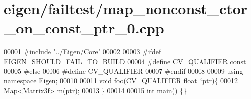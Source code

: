 \hypertarget{eigen_2failtest_2map__nonconst__ctor__on__const__ptr__0_8cpp_source}{}\section{eigen/failtest/map\+\_\+nonconst\+\_\+ctor\+\_\+on\+\_\+const\+\_\+ptr\+\_\+0.cpp}
\label{eigen_2failtest_2map__nonconst__ctor__on__const__ptr__0_8cpp_source}

\begin{DoxyCode}
00001 \textcolor{preprocessor}{#include "../Eigen/Core"}
00002 
00003 \textcolor{preprocessor}{#ifdef EIGEN\_SHOULD\_FAIL\_TO\_BUILD}
00004 \textcolor{preprocessor}{#define CV\_QUALIFIER const}
00005 \textcolor{preprocessor}{#else}
00006 \textcolor{preprocessor}{#define CV\_QUALIFIER}
00007 \textcolor{preprocessor}{#endif}
00008 
00009 \textcolor{keyword}{using namespace }\hyperlink{namespace_eigen}{Eigen};
00010 
00011 \textcolor{keywordtype}{void} foo(CV\_QUALIFIER \textcolor{keywordtype}{float} *ptr)\{
00012     \hyperlink{group___core___module_class_eigen_1_1_map}{Map<Matrix3f>} m(ptr);
00013 \}
00014 
00015 \textcolor{keywordtype}{int} main() \{\}
\end{DoxyCode}
